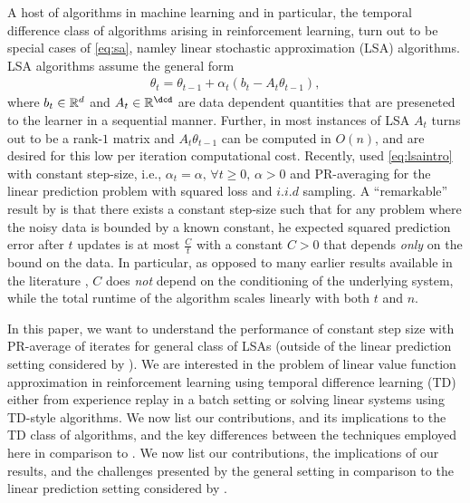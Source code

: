 A host of algorithms in machine learning and in particular, the temporal difference class of algorithms arising in reinforcement learning, turn out to be special cases of \eqref{eq:sa}, namley linear stochastic approximation (LSA) algorithms. LSA algorithms assume the general form
\begin{align}\label{eq:lsaintro}
\theta_t=\theta_{t-1}+\alpha_t (b_t-A_t \theta_{t-1}),
\end{align}
where $b_t\in \mathbb{R}^d$ and $A_t\in \R^{\dcd}$ are data dependent quantities that are preseneted to the learner in a sequential manner. Further, in most instances of LSA $A_t$ turns out to be a rank-$1$ matrix and $A_t\theta_{t-1}$ can be computed in $O(n)$, and are desired for this low per iteration computational cost. Recently, \cite{bach} used \eqref{eq:lsaintro} with constant step-size, i.e., $\alpha_t=\alpha,\,\forall t\geq 0, \, \alpha >0$ and PR-averaging for the linear prediction problem with squared loss and $i.i.d$ sampling. A ``remarkable'' result by \cite{bach} is that there exists a constant step-size such that for any problem where the noisy data is bounded by a known constant, he expected squared prediction error after $t$ updates is at most $\frac{C}{t}$ with a constant $C>0$ that depends \emph{only} on the bound on the data.
In particular, as opposed to many earlier results available in the literature , $C$ does \emph{not} depend on the conditioning of the underlying system, while the total runtime of the algorithm scales linearly with both $t$ and $n$.\par
In this paper, we want to understand the performance of constant step size with PR-average of iterates for general class of LSAs (outside of the linear prediction setting considered by \cite{bach}). We are interested in the problem of linear value function approximation in reinforcement learning using temporal difference learning (TD) either from experience replay in a batch setting or solving linear systems using TD-style algorithms.
  We now list our contributions, and its implications to the TD class of algorithms, and the key differences between the techniques employed here in comparison to \cite{bach}. We now list our contributions, the implications of our results, and the challenges presented by the general setting in comparison to the linear prediction setting considered by \cite{bach}.
